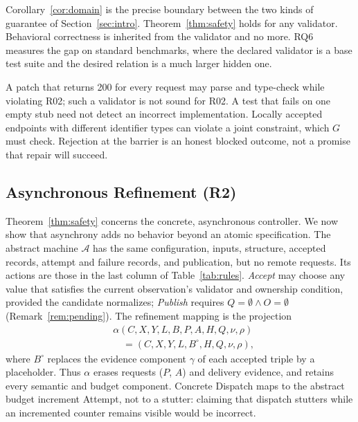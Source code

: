 Corollary~\ref{cor:domain} is the precise boundary between the two kinds of guarantee of Section~\ref{sec:intro}. Theorem~\ref{thm:safety} holds for any validator. Behavioral correctness is inherited from the validator and no more. RQ6 measures the gap on standard benchmarks, where the declared validator is a base test suite and the desired relation is a much larger hidden one.

\begin{example}\label{ex:limits}
A patch that returns 200 for every request may parse and type-check while violating R02; such a validator is not sound for R02. A test that fails on one empty stub need not detect an incorrect implementation. Locally accepted endpoints with different identifier types can violate a joint constraint, which $G$ must check. Rejection at the barrier is an honest blocked outcome, not a promise that repair will succeed.
\end{example}

\subsection{Asynchronous Refinement (R2)}\label{sec:refinement}
Theorem~\ref{thm:safety} concerns the concrete, asynchronous controller. We now show that asynchrony adds no behavior beyond an atomic specification. The abstract machine $\mathcal A$ has the same configuration, inputs, structure, accepted records, attempt and failure records, and publication, but no remote requests. Its actions are those in the last column of Table~\ref{tab:rules}. \emph{Accept} may choose any value that satisfies the current observation's validator and ownership condition, provided the candidate normalizes; \emph{Publish} requires $Q=\emptyset\land O=\emptyset$ (Remark~\ref{rem:pending}). The refinement mapping is the projection
\begin{equation}\label{eq:alpha}
\begin{split}
&\alpha(C,X,Y,L,B,P,A,H,Q,\nu,\rho)\\&\quad=(C,X,Y,L,B^{\circ},H,Q,\nu,\rho),
\end{split}
\end{equation}
where $B^{\circ}$ replaces the evidence component $\gamma$ of each accepted triple by a placeholder. Thus $\alpha$ erases requests ($P$, $A$) and delivery evidence, and retains every semantic and budget component. Concrete Dispatch maps to the abstract budget increment Attempt, not to a stutter: claiming that dispatch stutters while an incremented counter remains visible would be incorrect.

